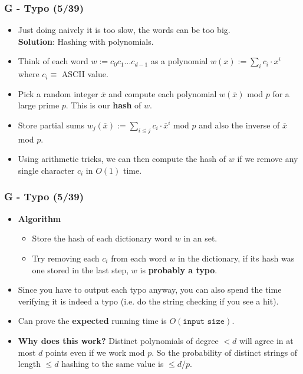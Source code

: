 \documentclass{beamer}
\begin{document}
\begin{frame}
\frametitle{G - Typo (5/39)}
\begin{itemize}
\setlength\itemsep{0.5\baselineskip}
\item Just doing naively  it is too slow, the words can be too big.\\
{\bf Solution}: Hashing with polynomials.
\item Think of each word $w := c_0c_1\ldots c_{d-1}$ as a polynomial $w(x) := \sum_i c_i \cdot x^i$ where $c_i \equiv$ ASCII value.
\item Pick a random integer $\overline x$ and compute each polynomial $w(\overline x)$ mod $p$ for a large prime $p$. This is our {\bf hash} of $w$.
\item Store partial sums $w_j(\overline x) := \sum_{i \leq j} c_i \cdot {\overline x}^i$ mod $p$ and also the inverse of $\overline x$ mod $p$.
\item Using arithmetic tricks, we can then compute the hash of $w$ if we remove any single character $c_i$ in $O(1)$ time.
\end{itemize}
\end{frame}
\begin{frame}
\frametitle{G - Typo (5/39)}
\begin{itemize}
\item {\bf Algorithm}\\
\begin{itemize}
\item Store the hash of each dictionary word $w$ in an set.
\item Try removing each $c_i$ from each word $w$ in the dictionary, if its hash was one stored in the last step, $w$ is {\bf probably a typo}.
\end{itemize}
\item Since you have to output each typo anyway, you can also spend the time verifying it is indeed a typo (i.e. do the string checking if you see a hit).
\item Can prove the {\bf expected} running time is $O(\texttt{input size})$.
\item {\bf Why does this work?} Distinct polynomials of degree $< d$ will agree in at most $d$ points even if we work mod $p$. So the probability of distinct strings of length $\leq d$ hashing to the same value is $\leq d/p$.
\end{itemize}
\end{frame}
\end{document}

